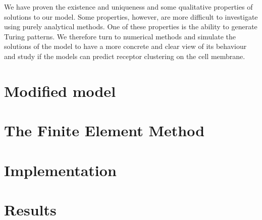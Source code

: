 We have proven the existence and uniqueness and some qualitative properties of solutions to our model. Some properties, however, are more difficult to investigate using purely analytical methods. One of these properties is the ability to generate Turing patterns. We therefore turn to numerical methods and simulate the solutions of the model to have a more concrete and clear view of its behaviour and study if the models can predict receptor clustering on the cell membrane.

\section{Modified model}


\section{The Finite Element Method}


\section{Implementation}


\section{Results}

